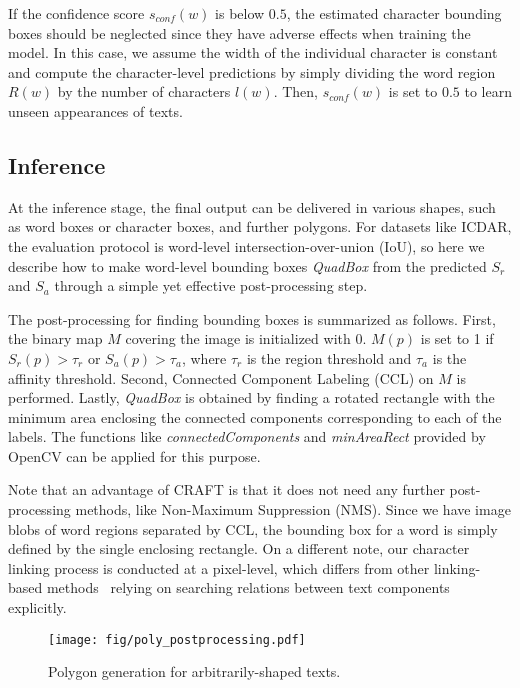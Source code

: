 \documentclass[10pt,twocolumn,letterpaper]{article}
\begin{document}
If the confidence score $s_{conf}(w)$ is below $0.5$, the estimated character bounding boxes should be neglected since they have adverse effects when training the model. In this case, we assume the width of the individual character is constant and compute the character-level predictions by simply dividing the word region $R(w)$ by the number of characters $l(w)$. Then, $s_{conf}(w)$ is set to $0.5$ to learn unseen appearances of texts.





\subsection{Inference}
At the inference stage, the final output can be delivered in various shapes, such as word boxes or character boxes, and further polygons.
For datasets like ICDAR, the evaluation protocol is word-level intersection-over-union (IoU), so here we describe how to make word-level bounding boxes \textit{QuadBox} from the predicted $S_r$ and $S_a$ through a simple yet effective post-processing step. 

The post-processing for finding bounding boxes is summarized as follows. First, the binary map $M$ covering the image is initialized with 0. ${M}(p)$ is set to 1 if $S_{r}(p) > {\tau}_{r}$ or $S_{a}(p) > {\tau}_{a}$, where ${\tau}_{r}$ is the region threshold and ${\tau}_{a}$ is the affinity threshold. Second, Connected Component Labeling (CCL) on ${M}$ is performed. Lastly, \textit{QuadBox} is obtained by finding a rotated rectangle with the minimum area enclosing the connected components corresponding to each of the labels. The functions like \textit{connectedComponents} and \textit{minAreaRect} provided by OpenCV can be applied for this purpose.





Note that an advantage of CRAFT is that it does not need any further post-processing methods, like Non-Maximum Suppression (NMS). Since we have image blobs of word regions separated by CCL, the bounding box for a word is simply defined by the single enclosing rectangle. On a different note, our character linking process is conducted at a pixel-level, which differs from other linking-based methods~\cite{shi2017detecting,hu2017wordsup} relying on searching relations between text components explicitly.

\begin{figure}[t]
 \begin{center}
   \texttt{[image: fig/poly\_postprocessing.pdf]}
\vspace{-1mm}
   \caption{Polygon generation for arbitrarily-shaped texts.}
   \label{fig:poly_postprocessing} 
   \vspace{-5mm}
  \end{center}
\end{figure}
\end{document}
